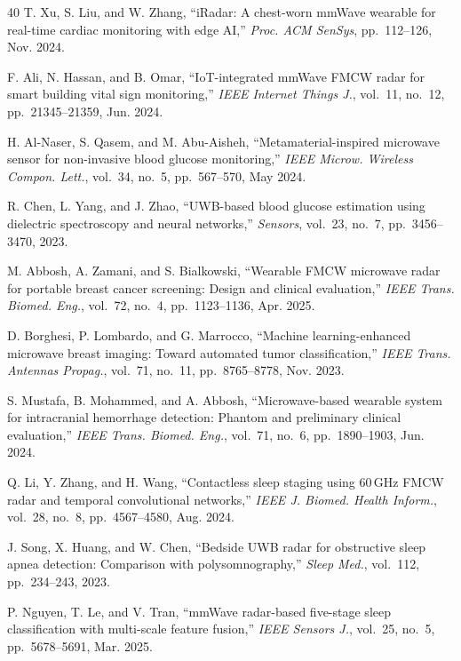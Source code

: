 \documentclass[journal,twoside]{IEEEtran}
\begin{document}
\begin{thebibliography}{40}
T. Xu, S. Liu, and W. Zhang, ``iRadar: A chest-worn mmWave wearable for real-time cardiac monitoring with edge AI,'' \textit{Proc. ACM SenSys}, pp.~112--126, Nov. 2024.

F. Ali, N. Hassan, and B. Omar, ``IoT-integrated mmWave FMCW radar for smart building vital sign monitoring,'' \textit{IEEE Internet Things J.}, vol.~11, no.~12, pp.~21345--21359, Jun. 2024.

H. Al-Naser, S. Qasem, and M. Abu-Aisheh, ``Metamaterial-inspired microwave sensor for non-invasive blood glucose monitoring,'' \textit{IEEE Microw. Wireless Compon. Lett.}, vol.~34, no.~5, pp.~567--570, May 2024.

R. Chen, L. Yang, and J. Zhao, ``UWB-based blood glucose estimation using dielectric spectroscopy and neural networks,'' \textit{Sensors}, vol.~23, no.~7, pp.~3456--3470, 2023.

M. Abbosh, A. Zamani, and S. Bialkowski, ``Wearable FMCW microwave radar for portable breast cancer screening: Design and clinical evaluation,'' \textit{IEEE Trans. Biomed. Eng.}, vol.~72, no.~4, pp.~1123--1136, Apr. 2025.

D. Borghesi, P. Lombardo, and G. Marrocco, ``Machine learning-enhanced microwave breast imaging: Toward automated tumor classification,'' \textit{IEEE Trans. Antennas Propag.}, vol.~71, no.~11, pp.~8765--8778, Nov. 2023.

S. Mustafa, B. Mohammed, and A. Abbosh, ``Microwave-based wearable system for intracranial hemorrhage detection: Phantom and preliminary clinical evaluation,'' \textit{IEEE Trans. Biomed. Eng.}, vol.~71, no.~6, pp.~1890--1903, Jun. 2024.

Q. Li, Y. Zhang, and H. Wang, ``Contactless sleep staging using 60\,GHz FMCW radar and temporal convolutional networks,'' \textit{IEEE J. Biomed. Health Inform.}, vol.~28, no.~8, pp.~4567--4580, Aug. 2024.

J. Song, X. Huang, and W. Chen, ``Bedside UWB radar for obstructive sleep apnea detection: Comparison with polysomnography,'' \textit{Sleep Med.}, vol.~112, pp.~234--243, 2023.

P. Nguyen, T. Le, and V. Tran, ``mmWave radar-based five-stage sleep classification with multi-scale feature fusion,'' \textit{IEEE Sensors J.}, vol.~25, no.~5, pp.~5678--5691, Mar. 2025.

\end{thebibliography}
\end{document}
